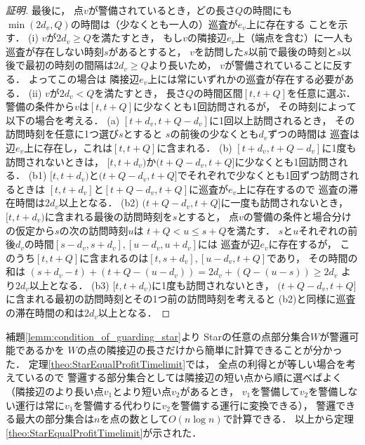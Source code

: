 \begin{proof}[証明]
  最後に，
  点$v$が警備されているとき，どの長さ$Q$の時間にも
  $\min(2d_v, Q)$の時間は（少なくとも一人の）巡査が$e_v$上に存在する
  ことを示す．
  (i) $v$が$2d_v \geq Q$を満たすとき，
    もし$v$の隣接辺$e_v$上（端点を含む）に一人も巡査が存在しない時刻$s$があるとすると，
    $v$を訪問した$s$以前で最後の時刻と$s$以後で最初の時刻の間隔は$2d_v \geq Q$より長いため，
    $v$が警備されていることに反する．
    よってこの場合は
    隣接辺$e_v$上には常にいずれかの巡査が存在する必要がある．
  (ii) $v$が$2d_v < Q$を満たすとき，
    長さ$Q$の時間区間$[t, t + Q]$を任意に選ぶ．
    警備の条件から$v$は$[t, t + Q]$に少なくとも1回訪問されるが，
    その時刻によって以下の場合を考える．
    (a) $[t + d_v, t + Q - d_v]$に1回以上訪問されるとき，
      その訪問時刻を任意に1つ選び$s$とすると
      $s$の前後の少なくとも$d_v$ずつの時間は
      巡査は辺$e_v$上に存在し，これは$[t, t + Q]$に含まれる．
    (b) $[t + d_v, t + Q - d_v]$に1度も訪問されないときは，
      $[t, t + d_v)$か$(t + Q - d_v, t + Q]$に少なくとも1回訪問される．
      (b1) $[t, t + d_v)$と$(t + Q - d_v, t + Q]$でそれぞれで少なくとも1回ずつ訪問されるときは
        $[t, t + d_v]$と$[t + Q - d_v, t + Q]$に巡査が$e_v$上に存在するので
        巡査の滞在時間は$2d_v$以上となる．
      (b2) $(t + Q - d_v, t + Q]$に一度も訪問されないとき，
        $[t, t + d_v)$に含まれる最後の訪問時刻を$s$とすると，
        点$v$の警備の条件と場合分けの仮定から$s$の次の訪問時刻$u$は
        $t + Q < u \leq s + Q$を満たす．
        $s$と$u$それぞれの前後$d_v$の時間$[s - d_v, s + d_v], [u - d_v, u + d_v]$には
        巡査が辺$e_v$に存在するが，
        このうち$[t, t + Q]$に含まれるのは$[t, s + d_v], [u - d_v, t + Q]$であり，
        その時間の和は
        $(s + d_v - t) + (t + Q - (u - d_v)) = 2d_v + (Q - (u - s)) \geq 2d_v$
        より$2d_v$以上となる．
      (b3) $[t, t + d_v)$に1度も訪問されないとき，
        $(t + Q - d_v, t + Q]$に含まれる最初の訪問時刻とその1つ前の訪問時刻を考えると
        (b2)と同様に巡査の滞在時間の和は$2d_v$以上となる．
        
\end{proof}



補題\ref{lemm:condition_of_guarding_star}より
Starの任意の点部分集合$W$が警邏可能であるかを
$W$の点の隣接辺の長さだけから簡単に計算できることが分かった．
定理\ref{theo:StarEqualProfitTimelimit}では，
全点の利得と{\idletime}が等しい場合を考えているので
警邏する部分集合としては隣接辺の短い点から順に選べばよく
（隣接辺のより長い点$v_1$とより短い点$v_2$があるとき，
$v_1$を警備して$v_2$を警備しない運行は常に$v_1$を警備する代わりに$v_2$を警備する運行に変換できる），
警邏できる最大の部分集合は$n$を点の数として$O(n \log n)$で計算できる．
以上から定理\ref{theo:StarEqualProfitTimelimit}が示された．

